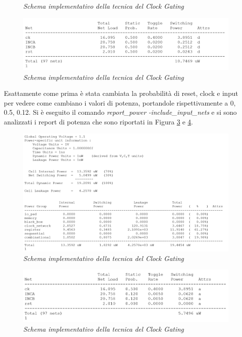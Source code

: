 {\begin{figure}[!htb]
	\caption{\textit{Schema implementativo della tecnica del Clock Gating}}
	\label{3_7}
\end{figure}
\begin{figure}[!htb]
	\centering
	\includegraphics[scale=0.65]{immagini/3_8}
	\caption{\textit{Schema implementativo della tecnica del Clock Gating}}
	\label{3_8}
\end{figure}
\newpage
Esattamente come prima è stata cambiata la probabilità di reset, clock e input per vedere come cambiano i valori di potenza, portandole rispettivamente a 0, 0.5, 0.12.
Si è eseguito il comando \textit{report\_power -include\_input\_nets} e si sono analizzati i report di potenza che sono riportati in Figura \ref{3_9} e \ref{3_10}.\\
\begin{figure}[!htb]
	\centering
	\includegraphics[scale=0.65]{immagini/3_9}
	\caption{\textit{Schema implementativo della tecnica del Clock Gating}}
	\label{3_9}
\end{figure}
\begin{figure}[!htb]
	\centering
	\includegraphics[scale=0.65]{immagini/3_10}
	\caption{\textit{Schema implementativo della tecnica del Clock Gating}}
	\label{3_10}
\end{figure}
\newpage

}
